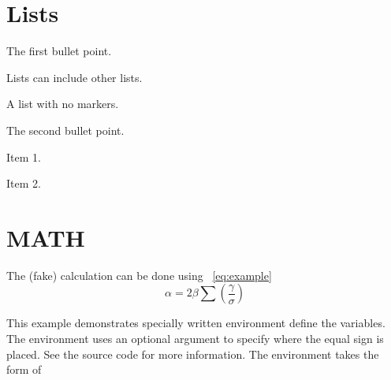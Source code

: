 \section{Lists}
\begin{bulletedlist}
	\item The first bullet point.
	\begin{bulletedlist}
		\item Lists can include other lists.
		\begin{plainlist}
			\item A list with no markers.
		\end{plainlist}
	\end{bulletedlist}
	\item The second bullet point.
	\begin{numberedlist}
		\item Item 1.
		\item Item 2.
	\end{numberedlist}
\end{bulletedlist}


\section{MATH}
The (fake) calculation can be done using \equationname~\ref{eq:example}
\begin{equation}
	\alpha = 2\beta\sum \left( \frac{\gamma}{\sigma} \right)
	\label{eq:example}
\end{equation}
\begin{mathwhere}[0.3in] %
\end{mathwhere}
This example demonstrates specially written  environment define the variables.  The  environment uses an optional argument to specify where the equal sign is placed.  See the source code for more information.  The environment takes the form of
\begin{plainlist}
	\item {}
	\begin{plainlist}
		\item {}
	\end{plainlist}
	\item {}
\end{plainlist}
\begin{mathwhere}[0.85in]
\end{mathwhere}


